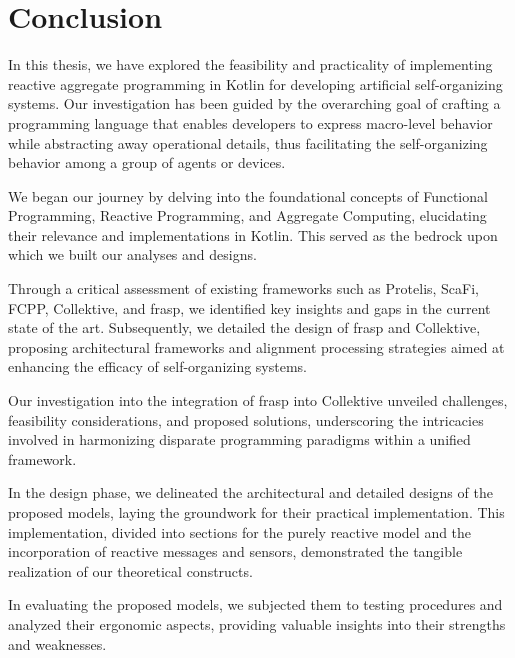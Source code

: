 
\chapter{Conclusion}
\label{chap:conclusion}

In this thesis, we have explored the feasibility and practicality of implementing reactive aggregate programming in Kotlin for developing artificial self-organizing systems. Our investigation has been guided by the overarching goal of crafting a programming language that enables developers to express macro-level behavior while abstracting away operational details, thus facilitating the self-organizing behavior among a group of agents or devices.

We began our journey by delving into the foundational concepts of Functional Programming, Reactive Programming, and Aggregate Computing, elucidating their relevance and implementations in Kotlin. This served as the bedrock upon which we built our analyses and designs.

Through a critical assessment of existing frameworks such as Protelis, ScaFi, FCPP, Collektive, and \ac{frasp}, we identified key insights and gaps in the current state of the art. Subsequently, we detailed the design of \ac{frasp} and Collektive, proposing architectural frameworks and alignment processing strategies aimed at enhancing the efficacy of self-organizing systems.

Our investigation into the integration of \ac{frasp} into Collektive unveiled challenges, feasibility considerations, and proposed solutions, underscoring the intricacies involved in harmonizing disparate programming paradigms within a unified framework.

In the design phase, we delineated the architectural and detailed designs of the proposed models, laying the groundwork for their practical implementation. This implementation, divided into sections for the purely reactive model and the incorporation of reactive messages and sensors, demonstrated the tangible realization of our theoretical constructs.

In evaluating the proposed models, we subjected them to testing procedures and analyzed their ergonomic aspects, providing valuable insights into their strengths and weaknesses.

